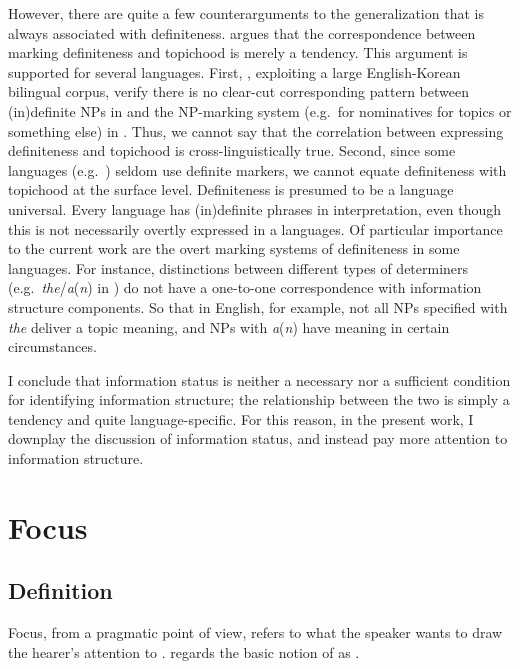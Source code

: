 \noindent However, there are quite a few counterarguments to the
generalization that  is always associated with definiteness.
\citet{erteschik:07} argues that the correspondence between marking
definiteness and topichood is merely a tendency. This argument is
supported for several languages. First, \citet{yoo:etal:07},
exploiting a large English-Korean bilingual corpus, verify there is no
clear-cut corresponding pattern between (in)definite NPs in 
and the NP-marking system (e.g.\ \ika for nominatives \vs \nun for
topics or something else) in . Thus, we cannot say that
the correlation between expressing definiteness and topichood is
cross-linguistically true. Second, since some languages
(e.g.\ ) seldom use definite markers, we cannot equate
definiteness with topichood at the surface level.  Definiteness is
presumed to be a language universal. Every language has (in)definite
phrases in interpretation, even though this is not necessarily overtly
expressed in a languages.  Of particular importance to the current
work are the overt marking systems of definiteness in some
languages. For instance, distinctions between different types of
determiners (e.g.\ \textit{the}/\textit{a}(\textit{n}) in ) do
not have a one-to-one correspondence with information structure
components.  So that in English, for example, not all NPs specified
with \textit{the} deliver a topic meaning, and NPs with
\textit{a}(\textit{n}) have  meaning in certain circumstances.

I conclude that information status is neither a necessary nor a
sufficient condition for identifying information structure; the
relationship between the two is simply a tendency and quite
language-specific. For this reason, in the present work, I downplay
the discussion of information status, and instead pay more attention
to information structure.



\section{Focus}
\label{3:sec:focus}


\subsection{Definition}
\label{3:ssec:definition-focus}

Focus, from a pragmatic point of view, refers to what the speaker
wants to draw the hearer's attention to
\citep{erteschik:07,fery:krifka:08}.  \citet{lambrecht:96} regards the
basic notion of  as .

